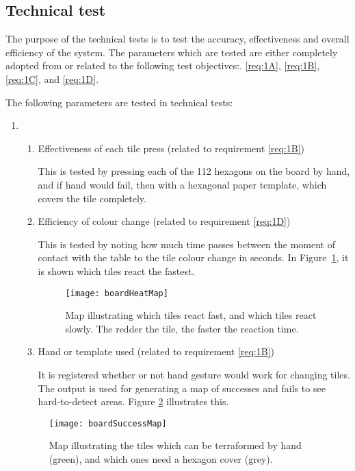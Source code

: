 \subsection{Technical test}
The purpose of the technical tests is to test the accuracy, effectiveness and overall efficiency of the system. The parameters which are tested are either completely adopted from or related to the following test objectives:. \ref{req:1A}, \ref{req:1B}, \ref{req:1C}, and \ref{req:1D}.

The following parameters are tested in technical tests:
\begin{enumerate}
\item \begin{enumerate}
\item Effectiveness of each tile press (related to requirement \ref{req:1B})

This is tested by pressing each of the 112 hexagons on the board by hand, and if hand would fail, then with a hexagonal paper template, which covers the tile completely. 

\item Efficiency of colour change (related to requirement \ref{req:1D})
		
This is tested by noting how much time passes between the moment of contact with the table to the tile colour change in seconds. In Figure~\ref{fig:reactionmap}, it is shown which tiles react the fastest.

\begin{figure}[h!]
	\centering
	\texttt{[image: boardHeatMap]}
	\caption{Map illustrating which tiles react fast, and which tiles react slowly. The redder the tile, the faster the reaction time. \label{fig:reactionmap}}
\end{figure}
		
\item Hand or template used (related to requirement \ref{req:1B})

It is registered whether or not hand gesture would work for changing tiles. The output is used for generating a map of successes and fails to see hard-to-detect areas. Figure \ref{fig:successfailmap} illustrates this.
\end{enumerate}		
		
\begin{figure}[h!]
	\centering
	\texttt{[image: boardSuccessMap]}
	\caption{Map illustrating the tiles which can be terraformed by hand (green), and which ones need a hexagon cover (grey).\label{fig:successfailmap}}
\end{figure}


\end{enumerate}
